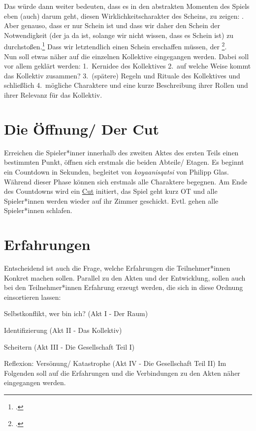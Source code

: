 \documentclass[12pt, a4paper, openany]{report}
\let\tempone\itemize
\let\temptwo\enditemize
\renewenvironment{itemize}{\tempone\addtolength{\itemsep}{-0.5\baselineskip}}{\temptwo}
\begin{document}
Das würde dann weiter bedeuten, dass es in den abstrakten Momenten des Spiels eben (auch) darum geht, diesen Wirklichkeitscharakter des Scheins, zu zeigen: 
. 
Aber genauso, dass er nur Schein ist und dass wir daher den Schein der Notwendigkeit (der ja da ist, solange wir nicht wissen, dass es Schein ist) zu durchstoßen.\footcite[Vgl.][41]{menke_autonomie_2018}
Dass wir letztendlich einen Schein erschaffen müssen, der \footcite[][417]{nietzsche_morgenrote_1999}.\\

Nun soll etwas näher auf die einzelnen Kollektive eingegangen werden. Dabei soll
vor allem geklärt werden: 1.~Kernidee des Kollektives 2.~auf welche Weise kommt
das Kollektiv zusammen? 3.~(spätere) Regeln und Rituale des Kollektives und
schließlich 4.~mögliche Charaktere und eine kurze Beschreibung ihrer Rollen und
ihrer Relevanz für das Kollektiv.


\section{Die Öffnung/ Der Cut} \label{die-öffnung}
Erreichen die Spieler*inner innerhalb des zweiten Aktes des ersten Teils einen bestimmten Punkt, öffnen sich erstmals die beiden Abteile/ Etagen. 
Es beginnt ein Countdown in Sekunden, begleitet von \textit{koyaanisqatsi} von Philipp Glas. 
Während dieser Phase können sich erstmals alle Charaktere begegnen. 
Am Ende des Countdowns wird ein \hyperref[cut]{Cut} initiert, das Spiel geht kurz OT und alle Spieler*innen werden wieder auf ihr Zimmer geschickt. 
Evtl. gehen alle Spieler*innen schlafen.  

\section{Erfahrungen}
Entscheidend ist auch die Frage, welche Erfahrungen die Teilnehmer*innen Konkret machen sollen.
Parallel zu den Akten und der Entwicklung, sollen auch bei den Teilnehmer*innen Erfahrung erzeugt werden, die sich in diese Ordnung einsortieren lassen:
\begin{itemize}
\item Selbstkonflikt, wer bin ich? (Akt I - Der Raum)
\item Identifizierung (Akt II - Das Kollektiv)
\item Scheitern (Akt III - Die Gesellschaft Teil I)
\item Reflexion: Versönung/ Katastrophe (Akt IV - Die Gesellschaft Teil II)
Im Folgenden soll auf die Erfahrungen und die Verbindungen zu den Akten näher eingegangen werden.
\end{itemize}
\end{document}
